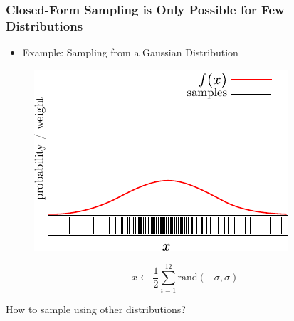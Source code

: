 \begin{frame}
    \frametitle{Closed-Form Sampling is Only Possible for Few Distributions}

    \begin{itemize}
        \item Example: Sampling from a Gaussian Distribution
    \end{itemize}

    \begin{figure}
        \begin{minipage}[m]{.5\textwidth}
            \raggedright
            \begin{center}
                \includegraphics[width=\columnwidth]{./images/particle_filter/gaussian_approximation_by_sampling.pdf}
            \end{center}
        \end{minipage}%
        \begin{minipage}[m]{.5\textwidth}
            \raggedleft
            \centering
            \begin{equation*}
                x \leftarrow \frac{1}{2} \sum_{i=1}^{12} \text{rand}(-\sigma, \sigma)    
            \end{equation*}
        \end{minipage}
    \end{figure}

    How to sample using other distributions?

\end{frame}


